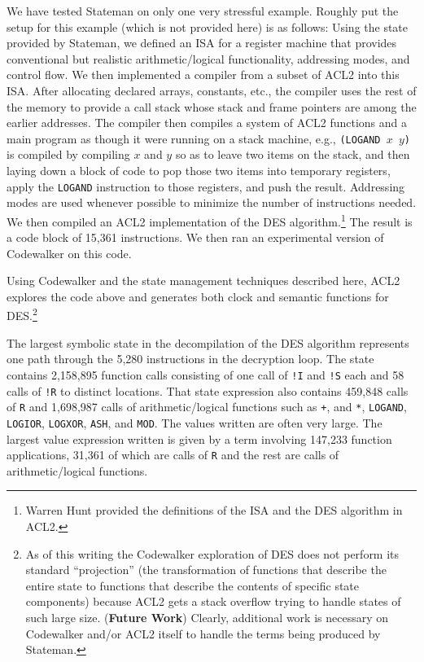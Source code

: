 \documentclass[submission,copyright,creativecommons]{eptcs}
\newcommand{\ptt}[1]{\tt{#1}}
\begin{document}
We have tested Stateman on only one very stressful example.  Roughly put the
setup for this example (which is not provided here) is as follows: Using the
state provided by Stateman, we defined an ISA for a register machine that
provides conventional but realistic arithmetic/logical functionality,
addressing modes, and control flow.  We then implemented a compiler from a
subset of ACL2 into this ISA.  After allocating declared arrays, constants,
etc., the compiler uses the rest of the memory to provide a call stack whose
stack and frame pointers are among the earlier addresses.  The compiler then
compiles a system of ACL2 functions and a main program as though it were
running on a stack machine, e.g., {\ptt{(LOGAND $x$ $y$)}} is compiled by compiling
$x$ and $y$ so as to leave two items on the stack, and then laying down a
block of code to pop those two items into temporary registers, apply the
{\ptt{LOGAND}} instruction to those registers, and push the result.
Addressing modes are used whenever possible to minimize the number of
instructions needed.  We then compiled an ACL2 implementation of the DES
algorithm.\footnote{Warren Hunt provided the definitions of the ISA and the
  DES algorithm in ACL2.}  The result is a code block of 15,361 instructions.
We then ran an experimental version of Codewalker on this code.

Using Codewalker and the state management techniques described here, ACL2
explores the code above and generates both clock and semantic functions for
DES.\footnote{As of this writing the Codewalker exploration of DES does not
  perform its standard ``projection'' (the transformation of functions that
  describe the entire state to functions that describe the contents of
  specific state components) because ACL2 gets a stack overflow trying to
  handle states of such large size.  ({\bf{Future Work}}) Clearly, additional
  work is necessary on Codewalker and/or ACL2 itself to handle the terms
  being produced by Stateman.}

The largest symbolic state in the decompilation of the DES algorithm
represents one path through the 5,280 instructions in the decryption loop.
The state contains 2,158,895 function calls consisting of one call of
{\ptt{!I}} and {\ptt{!S}} each and 58 calls of {\ptt{!R}} to distinct
locations.  That state expression also contains 459,848 calls of {\ptt{R}}
and 1,698,987 calls of arithmetic/logical functions such as {\ptt{+}}, and
{\ptt{*}}, {\ptt{LOGAND}}, {\ptt{LOGIOR}}, {\ptt{LOGXOR}}, {\ptt{ASH}}, and
{\ptt{MOD}}.  The values written are often very large.  The largest value
expression written is given by a term involving 147,233 function
applications, 31,361 of which are calls of {\ptt{R}} and the rest are calls
of arithmetic/logical functions.
\end{document}
